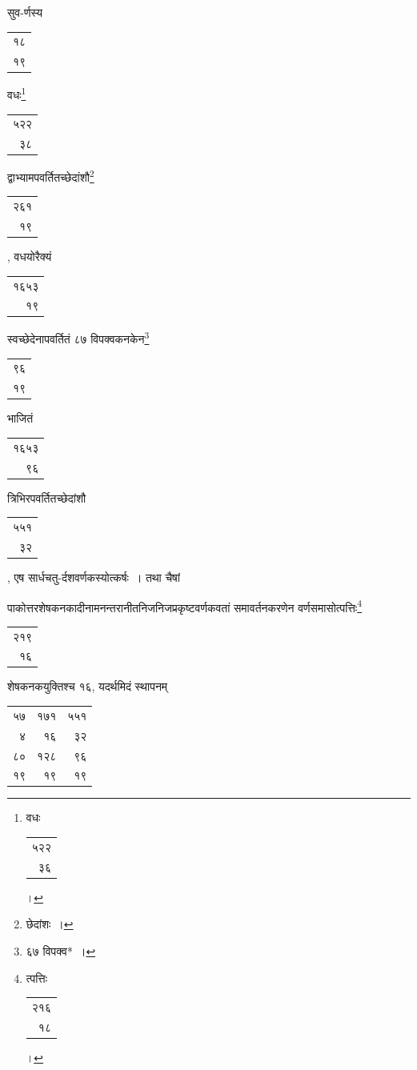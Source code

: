 \documentclass[10pt, openany]{book}
\begin{document}
{{{सुव-र्णस्य\begin{tabular}{r}१८\\  १९\end{tabular}वधः\renewcommand{\thefootnote}{\s ४}\footnote{\s *वधः\begin{tabular}{r}५२२\\३६\end{tabular}।}}{\begin{tabular}{r}५२२\\३८\end{tabular} द्वाभ्यामपवर्तितच्छेदांशौ\renewcommand{\thefootnote}{\s ५}\footnote{\s *छेदांशः~।}\begin{tabular}{r}२६१\\१९ \end{tabular}, वधयोरैक्यं\begin{tabular}{r}१६५३\\१९ \end{tabular}
स्वच्छेदेनापवर्तितं ८७ विपक्वकनकेन\renewcommand{\thefootnote}{\s ६}\footnote{\s ६७ विपक्व*~।}}{\begin{tabular}{r}९६\\१९ \end{tabular}भाजितं\begin{tabular}{r}१६५३\\९६ \end{tabular}त्रिभिरपवर्तितच्छेदांशौ\begin{tabular}{r}५५१\\३२
\end{tabular}, एष
सार्धचतु-र्दशवर्णकस्योत्कर्षः~। तथा चैषां}
{पाकोत्तरशेषकनकादीनामनन्तरानीतनिजनिजप्रकृष्टवर्णकवतां समावर्तनकरणेन
वर्णसमासोत्पत्तिः\renewcommand{\thefootnote}{\s ७}\footnote{\s *त्पत्तिः\begin{tabular}{r}२१६\\१८\end{tabular}।}\begin{tabular}{r}२१९\\ १६\end{tabular}शेषकनकयुक्तिश्च १६, यदर्थमिदं स्थापनम्\textemdash}

\vspace{0.1cm}
\hspace{40mm}\begin{tabular}{r|r|r} ५७& १७१& ५५१\\ ४& १६ &३२\\
\hline 
८० & १२८ & ९६\\१९ & १९ & १९\\
\end{tabular}

}}
\end{document}
